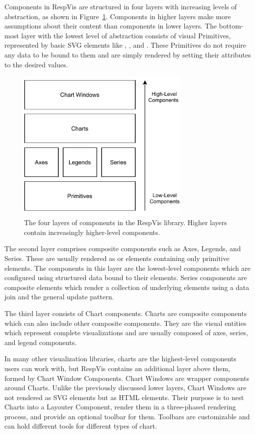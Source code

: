 Components in RespVis are structured in four layers with increasing
levels of abstraction, as shown in Figure~\ref{fig:Layers}. Components
in higher layers make more assumptions about their content than
components in lower layers. The bottom-most layer with the lowest
level of abstraction consists of visual Primitives, represented by
basic SVG elements like , , and
. These Primitives do not require any data to be bound to
them and are simply rendered by setting their attributes to the
desired values.


\begin{figure}[tp]
\centering
\includegraphics[keepaspectratio,width=\linewidth,height=7.5cm]
{diagrams/respvis-layers.pdf}
\caption[Component Layers of RespVis]{
The four layers of components in the RespVis library. Higher layers
contain increasingly higher-level components.
}
\label{fig:Layers}
\end{figure}


The second layer comprises composite components such as Axes, Legends,
and Series. These are usually rendered as  or 
elements containing only primitive elements. The components in this
layer are the lowest-level components which are configured using
structured data bound to their elements. Series components are
composite elements which render a collection of underlying elements
using a data join and the general update pattern.

The third layer consists of Chart components. Charts are composite
components which can also include other composite components. They are
the visual entities which represent complete visualizations and are
usually composed of axes, series, and legend components.

In many other visualization libraries, charts are the highest-level
components users can work with, but RespVis contains an additional
layer above them, formed by Chart Window Components. Chart Windows are
wrapper components around Charts. Unlike the previously discussed
lower layers, Chart Windows are not rendered as SVG elements but as
HTML  elements. Their purpose is to nest Charts into a
Layouter Component, render them in a three-phased rendering process,
and provide an optional toolbar for them. Toolbars are customizable
and can hold different tools for different types of chart.









